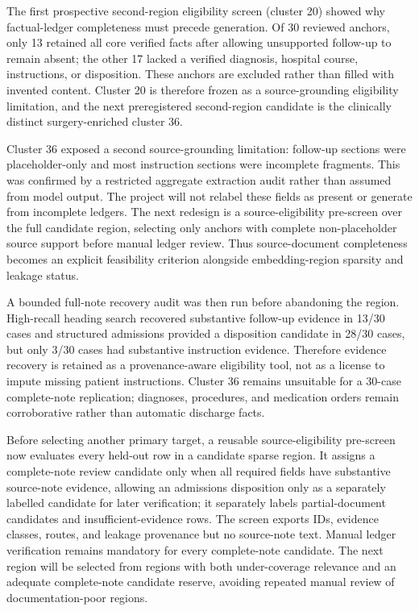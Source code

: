 \documentclass[11pt]{article}
\begin{document}
The first prospective second-region eligibility screen (cluster 20) showed why factual-ledger completeness must precede generation. Of 30 reviewed anchors, only 13 retained all core verified facts after allowing unsupported follow-up to remain absent; the other 17 lacked a verified diagnosis, hospital course, instructions, or disposition. These anchors are excluded rather than filled with invented content. Cluster 20 is therefore frozen as a source-grounding eligibility limitation, and the next preregistered second-region candidate is the clinically distinct surgery-enriched cluster 36.

Cluster 36 exposed a second source-grounding limitation: follow-up sections were placeholder-only and most instruction sections were incomplete fragments. This was confirmed by a restricted aggregate extraction audit rather than assumed from model output. The project will not relabel these fields as present or generate from incomplete ledgers. The next redesign is a source-eligibility pre-screen over the full candidate region, selecting only anchors with complete non-placeholder source support before manual ledger review. Thus source-document completeness becomes an explicit feasibility criterion alongside embedding-region sparsity and leakage status.

A bounded full-note recovery audit was then run before abandoning the region. High-recall heading search recovered substantive follow-up evidence in 13/30 cases and structured admissions provided a disposition candidate in 28/30 cases, but only 3/30 cases had substantive instruction evidence. Therefore evidence recovery is retained as a provenance-aware eligibility tool, not as a license to impute missing patient instructions. Cluster 36 remains unsuitable for a 30-case complete-note replication; diagnoses, procedures, and medication orders remain corroborative rather than automatic discharge facts.

Before selecting another primary target, a reusable source-eligibility pre-screen now evaluates every held-out row in a candidate sparse region. It assigns a complete-note review candidate only when all required fields have substantive source-note evidence, allowing an admissions disposition only as a separately labelled candidate for later verification; it separately labels partial-document candidates and insufficient-evidence rows. The screen exports IDs, evidence classes, routes, and leakage provenance but no source-note text. Manual ledger verification remains mandatory for every complete-note candidate. The next region will be selected from regions with both under-coverage relevance and an adequate complete-note candidate reserve, avoiding repeated manual review of documentation-poor regions.
\end{document}
